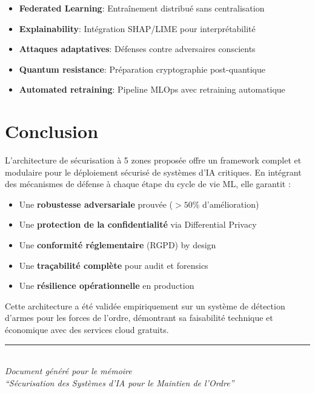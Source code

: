 \documentclass[11pt,a4paper]{article}
\begin{document}
\begin{tcolorbox}[colback=blue!5, colframe=blue!50!black, title=\textbf{Extensions Possibles}]
\begin{itemize}
    \item \textbf{Federated Learning}: Entraînement distribué sans centralisation
    \item \textbf{Explainability}: Intégration SHAP/LIME pour interprétabilité
    \item \textbf{Attaques adaptatives}: Défenses contre adversaires conscients
    \item \textbf{Quantum resistance}: Préparation cryptographie post-quantique
    \item \textbf{Automated retraining}: Pipeline MLOps avec retraining automatique
\end{itemize}
\end{tcolorbox}

\section{Conclusion}

L'architecture de sécurisation à 5 zones proposée offre un framework complet et modulaire pour le déploiement sécurisé de systèmes d'IA critiques. En intégrant des mécanismes de défense à chaque étape du cycle de vie ML, elle garantit :

\begin{itemize}
    \item Une \textbf{robustesse adversariale} prouvée ($>50\%$ d'amélioration)
    \item Une \textbf{protection de la confidentialité} via Differential Privacy
    \item Une \textbf{conformité réglementaire} (RGPD) by design
    \item Une \textbf{traçabilité complète} pour audit et forensics
    \item Une \textbf{résilience opérationnelle} en production
\end{itemize}

Cette architecture a été validée empiriquement sur un système de détection d'armes pour les forces de l'ordre, démontrant sa faisabilité technique et économique avec des services cloud gratuits.

\vfill

\begin{center}
\rule{0.8\textwidth}{0.5pt}\\[0.5em]
\textit{Document généré pour le mémoire}\\
\textit{``Sécurisation des Systèmes d'IA pour le Maintien de l'Ordre''}
\end{center}
\end{document}
